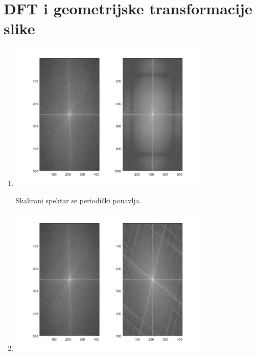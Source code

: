 \documentclass[12pt, a4]{report}
\begin{document}
        \section{DFT i geometrijske transformacije slike}
            \begin{enumerate}
                \item
                    \begin{minipage}{\linewidth}
                        \centering
                        \includegraphics[width=0.75\textwidth]{klis_scaled}
                    \end{minipage}
                    Skalirani spektar se periodički ponavlja.
                \item
                    \begin{minipage}{\linewidth}
                        \centering
                        \includegraphics[width=0.75\textwidth]{klis_rotated}

\end{minipage}
\end{enumerate}
\end{document}
